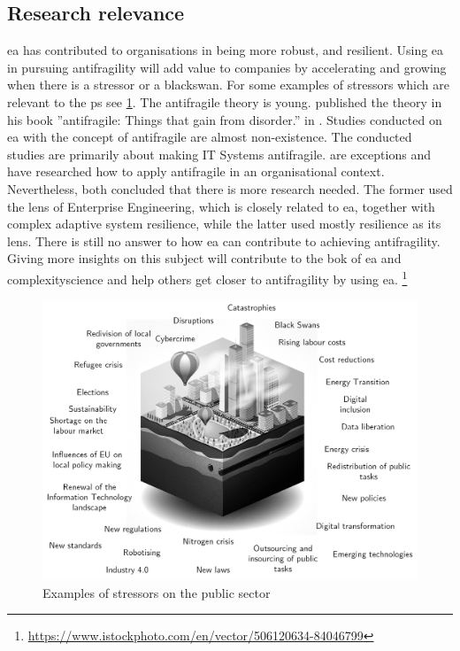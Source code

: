 \subsection{Research relevance}
\label{sub:researchrelevance}
\acrshort{ea} has contributed to organisations in being more \gls{robust}, and \gls{resilient}. Using \acrshort{ea} in pursuing \gls{antifragility} will add value to companies by accelerating and growing when there is a \gls{stressor} or a \gls{blackswan}. For some examples of \glspl{stressor} which are relevant to the \gls{ps} see \cref{fig:publicstressors}. The \gls{antifragile} theory is young. \citeauthor{Taleb2012} published the theory in his book ''\Gls{antifragile}: Things that gain from disorder.'' in \citeyear{Taleb2012}. Studies conducted on \acrshort{ea} with the concept of \gls{antifragile} are almost non-existence. The conducted studies are primarily about making IT Systems \gls{antifragile}. \textcites{Botjes2020}{Kastner2017} are exceptions and have researched how to apply \gls{antifragile} in an organisational context. Nevertheless, both concluded that there is more research needed. The former used the lens of Enterprise Engineering, which is closely related to \acrshort{ea}, together with complex adaptive system resilience, while the latter used mostly resilience as its lens. There is still no answer to how \acrshort{ea} can contribute to achieving \gls{antifragility}. Giving more insights on this subject will contribute to the \acrshort{bok} of \acrshort{ea} and \gls{complexityscience} and help others get closer to \gls{antifragility} by using \acrshort{ea}.
{\let\thefootnote\relax\footnote{{\url{https://www.istockphoto.com/en/vector/506120634-84046799}}}}
\begin{figure}[H]
	\centering
	\includegraphics[width=0.8\linewidth]{images/publicstressors}
	\caption[Examples of stressors on the public sector]{Examples of stressors on the public sector}
	\label{fig:publicstressors}
\end{figure}
